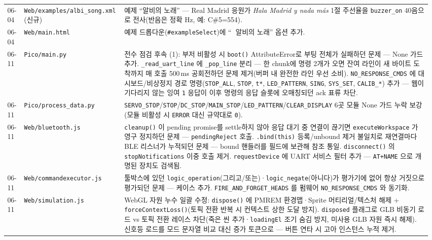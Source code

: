 \documentclass[11pt, oneside]{article}
\begin{document}
\begin{table}[h]
\begin{tabularx}{\linewidth}{@{}llX@{}}
06-04 & \texttt{Web/examples/albi\_song.xml} (신규) & 예제 ``알비의 노래'' --- Real Madrid 응원가 \textit{Hala Madrid y nada más} 1절 주선율을 \texttt{buzzer\_on} 40음으로 전사(반음은 정확 Hz, 예: C\#5=554). \\
06-04 & \texttt{Web/main.html} & 예제 드롭다운(\texttt{\#exampleSelect})에 ``🎵 알비의 노래'' 옵션 추가. \\
\midrule
06-11 & \texttt{Pico/main.py} & 전수 점검 후속 (1): 부저 비활성 시 \texttt{boot()} AttributeError로 부팅 전체가 실패하던 문제 --- None 가드 추가. \texttt{\_read\_uart\_line} 에 \texttt{\_pop\_line} 분리 --- 한 chunk에 명령 2개가 오면 잔여 라인이 새 바이트 도착까지 매 호출 500\,ms 공회전하던 문제 제거(버퍼 내 완전한 라인 우선 소비). \texttt{NO\_RESPONSE\_CMDS} 에 대시보드/비상정지 경로 명령(\texttt{STOP\_ALL}, \texttt{STOP}, \texttt{t*}, \texttt{LED\_PATTERN}, \texttt{SING}, \texttt{SYS\_SET}, \texttt{CALIB\_*}) 추가 --- 웹이 기다리지 않는 잉여 \texttt{1} 응답이 이후 명령의 응답 슬롯에 오매칭되던 ack 표류 차단. \\
06-11 & \texttt{Pico/process\_data.py} & \texttt{SERVO\_STOP}/\texttt{STOP}/\texttt{DC\_STOP}/\texttt{MAIN\_STOP}/\texttt{LED\_PATTERN}/\texttt{CLEAR\_DISPLAY} 6곳 모듈 None 가드 누락 보강(모듈 비활성 시 \texttt{ERROR} 대신 규약대로 \texttt{0}). \\
06-11 & \texttt{Web/bluetooth.js} & \texttt{cleanup()} 이 pending promise를 settle하지 않아 응답 대기 중 연결이 끊기면 \texttt{executeWorkspace} 가 영구 정지하던 문제 --- \texttt{pendingReject} 호출. \texttt{.bind(this)} 등록/unbound 제거 불일치로 재연결마다 BLE 리스너가 누적되던 문제 --- bound 핸들러를 필드에 보관해 참조 통일. \texttt{disconnect()} 의 \texttt{stopNotifications} 이중 호출 제거. \texttt{requestDevice} 에 UART 서비스 필터 추가 --- \texttt{AT+NAME} 으로 개명된 장치도 검색됨. \\
06-11 & \texttt{Web/commandexecutor.js} & 툴박스에 있던 \texttt{logic\_operation}(그리고/또는)·\texttt{logic\_negate}(아니다)가 평가기에 없어 항상 거짓으로 평가되던 문제 --- 케이스 추가. \texttt{FIRE\_AND\_FORGET\_HEADS} 를 펌웨어 \texttt{NO\_RESPONSE\_CMDS} 와 동기화. \\
06-11 & \texttt{Web/simulation.js} & WebGL 자원 누수 일괄 수정: \texttt{dispose()} 에 PMREM 환경맵·Sprite 머티리얼/텍스처 해제 + \texttt{forceContextLoss()}(토픽 전환 반복 시 컨텍스트 상한 도달 방지). \texttt{disposed} 플래그로 GLB 비동기 로드 vs 토픽 전환 레이스 차단(죽은 씬 추가·\texttt{loadingEl} 조기 숨김 방지, 미사용 GLB 자원 즉시 해제). 신호등 로드를 모드 문자열 비교 대신 증가 토큰으로 --- 버튼 연타 시 고아 인스턴스 누적 제거. \\

\end{tabularx}
\end{table}
\end{document}
